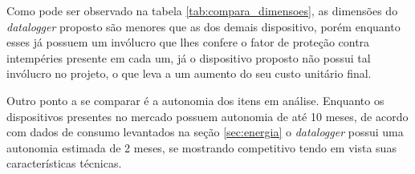\begin{table}[!h]
	
	\captionsetup{width=9cm}%
\end{table}


Como pode ser observado na tabela \ref{tab:compara_dimensoes}, as dimensões do \textit{datalogger} proposto são menores que as dos demais dispositivo, porém enquanto esses já possuem um invólucro que lhes confere o fator de proteção contra intempéries presente em cada um, já o dispositivo proposto não possui tal invólucro no projeto, o que leva a um aumento do seu custo unitário final. 

Outro ponto a se comparar é a autonomia dos itens em análise. Enquanto os dispositivos presentes no mercado possuem autonomia de até 10 meses, de acordo com dados de consumo levantados na seção \ref{sec:energia} o \textit{datalogger} possui uma autonomia estimada de 2 meses, se mostrando competitivo tendo em vista suas características técnicas.

